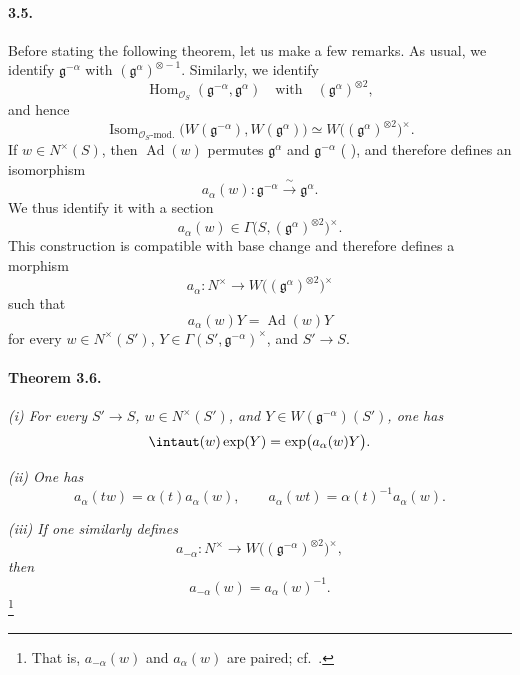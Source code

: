 

\paragraph{\textbf{3.5.}}
Before stating the following theorem, let us make a few remarks.  As
usual, we identify \(\mathfrak g^{-\alpha}\) with
\((\mathfrak g^\alpha)^{\otimes-1}\).  Similarly, we identify
\[
  \operatorname{Hom}_{\mathscr O_S}
    (\mathfrak g^{-\alpha},\mathfrak g^\alpha)
  \quad\text{with}\quad
  (\mathfrak g^\alpha)^{\otimes2},
\]
and hence
\[
  \operatorname{Isom}_{\mathscr O_S\text{-mod.}}
    \bigl(W(\mathfrak g^{-\alpha}),W(\mathfrak g^\alpha)\bigr)
  \simeq
  W\bigl((\mathfrak g^\alpha)^{\otimes2}\bigr)^\times.
\]
If \(w\in N^\times(S)\), then
\(\operatorname{Ad}(w)\) permutes
\(\mathfrak g^\alpha\) and \(\mathfrak g^{-\alpha}\)
\textup{( \textup{})}, and therefore defines an isomorphism
\[
  a_\alpha(w)\colon
  \mathfrak g^{-\alpha}\xrightarrow{\ \sim\ }\mathfrak g^\alpha.
\]
We thus identify it with a section
\[
  a_\alpha(w)\in
  \Gamma\bigl(S,(\mathfrak g^\alpha)^{\otimes2}\bigr)^\times.
\]
This construction is compatible with base change and therefore
defines a morphism
\[
  a_\alpha\colon
  N^\times\longrightarrow
  W\bigl((\mathfrak g^\alpha)^{\otimes2}\bigr)^\times
\]
such that
\[
  a_\alpha(w)Y=\operatorname{Ad}(w)Y
\]
for every \(w\in N^\times(S')\),
\(Y\in\Gamma(S',\mathfrak g^{-\alpha})^\times\), and \(S'\to S\).

\paragraph{\textbf{Theorem 3.6.}}
\emph{\textup{(i)} For every \(S'\to S\),
\(w\in N^\times(S')\), and
\(Y\in W(\mathfrak g^{-\alpha})(S')\), one has}
\[
  \intaut(w)\exp(Y)=\exp\bigl(a_\alpha(w)Y\bigr).
\]

\smallskip
\noindent\emph{\textup{(ii)} One has}
\[
  a_\alpha(tw)=\alpha(t)a_\alpha(w),
  \qquad
  a_\alpha(wt)=\alpha(t)^{-1}a_\alpha(w).
\]

\smallskip
\noindent\emph{\textup{(iii)} If one similarly defines}
\[
  a_{-\alpha}\colon
  N^\times\longrightarrow
  W\bigl((\mathfrak g^{-\alpha})^{\otimes2}\bigr)^\times,
\]
\emph{then}
\[
  a_{-\alpha}(w)=a_\alpha(w)^{-1}.
\]
\footnote{That is, \(a_{-\alpha}(w)\) and \(a_\alpha(w)\) are paired;
cf.\ .}

